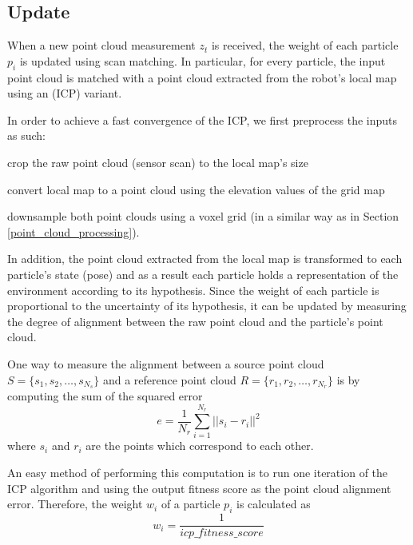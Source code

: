 \subsection{Update}

When a new point cloud measurement $z_t$ is received, the weight of each
particle $p_i$ is updated using scan matching.
In particular, for every particle, the input point cloud is matched with
a point cloud extracted from the robot's local map using
an  (ICP) variant.

In order to achieve a fast convergence of the ICP, we first preprocess
the inputs as such:
\begin{enumerate*}[label=(\roman*)]
    \item crop the raw point cloud (sensor scan) to the local map's size
    \item convert local map to a point cloud using the elevation values of
        the grid map
    \item downsample both point clouds using a voxel grid (in a similar way
        as in Section \ref{point_cloud_processing}).
\end{enumerate*}

In addition, the point cloud extracted from the local map is transformed to
each particle's state (pose) and as a result each particle holds a
representation of the environment according to its hypothesis.
Since the weight of each particle is proportional to the uncertainty
of its hypothesis, it can be updated by measuring the degree of
alignment between the raw point cloud and the particle's point cloud.

One way to measure the alignment between a source point cloud
$S = \{s_1, s_2, \dots, s_{N_s}\}$ and a reference point cloud
$R = \{r_1, r_2, \dots, r_{N_r}\}$ is by computing the sum of the
squared error
\begin{equation}
    e = \frac{1}{N_r} \sum_{i=1}^{N_r} || s_i - r_i ||^2
\end{equation}
where $s_i$ and $r_i$ are the points which correspond to each other.

An easy method of performing this computation is to run one iteration of
the ICP algorithm and using the output fitness score as the point cloud
alignment error.
Therefore, the weight $w_i$ of a particle $p_i$ is calculated as
\begin{equation}
    w_i = \frac{1}{icp\_fitness\_score}
\end{equation}

